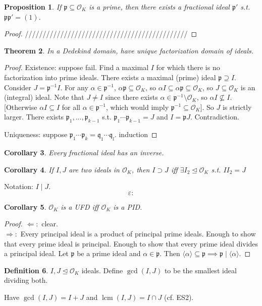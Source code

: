 \documentclass{article}
\theoremstyle{definition}
\newtheorem{defn}{Definition}[section]
\theoremstyle{remark}
\theoremstyle{plain}
\newtheorem{thm}[defn]{Theorem}
\newtheorem{prop}[defn]{Proposition}
\newtheorem{crly}[defn]{Corollary}
\newcommand{\e}{\varepsilon}
\begin{document}
\begin{prop}
    If $\mathfrak p\subseteq\mathcal O_K$ is a prime, then there exists a fractional ideal $\mathfrak p'$ s.t. $\mathfrak p\mathfrak p'=(1)$.
\end{prop}
\begin{proof}
    //////////////////////////////////////////////
\end{proof}
\begin{thm}
    In a Dedekind domain, have unique factorization domain of ideals.
\end{thm}
\begin{proof}
Existence: suppose fail. Find a maximal $I$ for which there is no factorization into prime ideals. There exists a maximal (prime) ideal $\mathfrak p\supseteq I$. Consider $J=\mathfrak p^{-1}I$. For any $\alpha\in\mathfrak p^{-1}$, $\alpha\mathfrak p\subseteq\mathcal O_K$, so $\alpha I\subseteq\alpha\mathfrak p\subseteq\mathcal O_K$, so $J\subseteq\mathcal O_K$ is an (integral) ideal. Note that $J\neq I$ since there exists $\alpha\in\mathfrak p^{-1}\setminus\mathcal O_K$, so $\alpha I\not\subseteq I$. [Otherwise $\alpha I\subseteq I$ for all $\alpha\in\mathfrak p^{-1}$, which would imply $\mathfrak p^{-1}\subseteq\mathcal O_K$]. So $J$ is strictly larger. There exists $\mathfrak p_1,...,\mathfrak p_{k-1}$ s.t. $\mathfrak p_1\cdots\mathfrak p_{k-1}=J$ and $I=\mathfrak p J$. Contradiction.

Uniqueness: suppose $\mathfrak p_1\cdots\mathfrak p_k=\mathfrak q_1\cdots\mathfrak q_l$. induction
\end{proof}
\begin{crly}
    Every fractional ideal has an inverse.
\end{crly}
\begin{crly}
    If $I, J$ are two ideals in $\mathcal O_K$, then $I\supset J$ iff $\exists I_2\trianglelefteq\mathcal O_K$ s.t. $II_2=J$
\end{crly}
Notation: $I\mid J$.
\[\e:\tag{Owen's Signature}\]
\begin{crly}
    $\mathcal O_K$ is a UFD iff $\mathcal O_K$ is a PID.
\end{crly}
\begin{proof}
    $\Leftarrow:$ clear.\\
    $\Rightarrow:$ Every principal ideal is a product of principal prime ideals. Enough to show that every prime ideal is principal. Enough to show that every prime ideal divides a principal ideal. Let $\mathfrak p$ be a prime ideal and $\alpha\in\mathfrak p$. Then $\langle\alpha\rangle\subseteq \mathfrak p\implies \mathfrak p\mid \langle\alpha\rangle$.    
\end{proof}
\begin{defn}
    $I,J\trianglelefteq\mathcal O_K$ ideals. Define $\gcd(I,J)$ to be the smallest ideal dividing both.
\end{defn}
Have $\gcd(I,J)=I+J$ and $\operatorname{lcm}(I,J)=I\cap J$ (cf. ES2).
\end{document}
